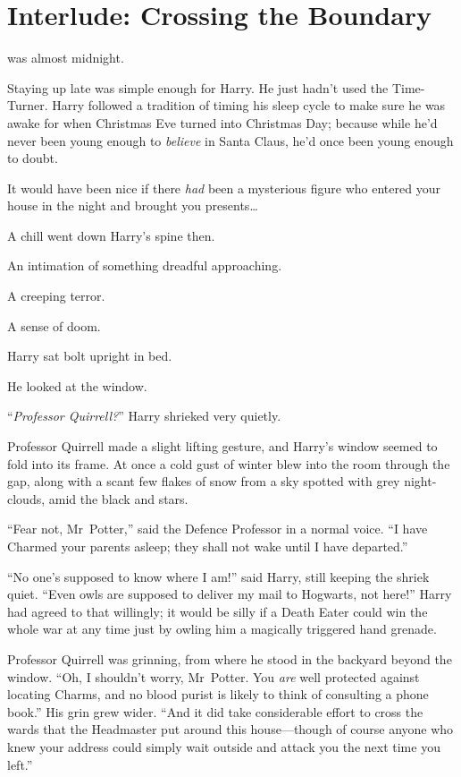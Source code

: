 \chapter{Interlude: Crossing the Boundary}

 was almost midnight.

\hplettrineextrapara
Staying up late was simple enough for Harry. He just hadn’t used the Time-Turner. Harry followed a tradition of timing his sleep cycle to make sure he was awake for when Christmas Eve turned into Christmas Day; because while he’d never been young enough to \emph{believe} in Santa Claus, he’d once been young enough to doubt.

It would have been nice if there \emph{had} been a mysterious figure who entered your house in the night and brought you presents…

A chill went down Harry’s spine then.

An intimation of something dreadful approaching.

A creeping terror.

A sense of doom.

Harry sat bolt upright in bed.

He looked at the window.

“\emph{Professor Quirrell?}” Harry shrieked very quietly.

Professor Quirrell made a slight lifting gesture, and Harry’s window seemed to fold into its frame. At once a cold gust of winter blew into the room through the gap, along with a scant few flakes of snow from a sky spotted with grey night-clouds, amid the black and stars.

“Fear not, Mr~Potter,” said the Defence Professor in a normal voice. “I have Charmed your parents asleep; they shall not wake until I have departed.”

“No one’s supposed to know where I am!” said Harry, still keeping the shriek quiet. “Even owls are supposed to deliver my mail to Hogwarts, not here!” Harry had agreed to that willingly; it would be silly if a Death Eater could win the whole war at any time just by owling him a magically triggered hand grenade.

Professor Quirrell was grinning, from where he stood in the backyard beyond the window. “Oh, I shouldn’t worry, Mr~Potter. You \emph{are} well protected against locating Charms, and no blood purist is likely to think of consulting a phone book.” His grin grew wider. “And it did take considerable effort to cross the wards that the Headmaster put around this house—though of course anyone who knew your address could simply wait outside and attack you the next time you left.”

